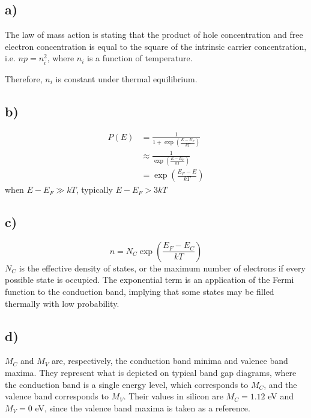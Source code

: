 \subsection*{a)}
The law of mass action is stating that the product of hole concentration and free electron concentration is equal to the square of the intrinsic carrier concentration, i.e. $n p = n_i^2$, where $n_i$ is a function of temperature.

Therefore, $n_i$ is constant under thermal equilibrium.
\subsection*{b)}
\[
\begin{aligned}
P(E) &= \frac{1}{1+\exp\left(\frac{E-E_F}{k T}\right)} \\
&\approx \frac{1}{\exp\left(\frac{E-E_F}{k T}\right)} \\
&= \exp\left(\frac{E_F - E}{k T}\right)
\end{aligned}
\]
when $E - E_F \gg k T$, typically $E - E_F > 3 k T $
\subsection*{c)}
$$n = N_C \exp \left(\frac{E_F - E_C}{k T} \right)$$
$N_C$ is the effective density of states, or the maximum number of electrons if every possible state is occupied.
The exponential term is an application of the Fermi function to the conduction band, implying that some states 
may be filled thermally with low probability.
\subsection*{d)}
$M_C$ and $M_V$ are, respectively, the conduction band minima and valence band maxima. They represent what is depicted on typical band gap diagrams, where the conduction band is a single energy level, which corresponds to $M_C$, and the valence band corresponds to $M_V$. Their values in silicon are $M_C = 1.12$ eV and $M_V = 0$ eV, since the valence band maxima is taken as a reference. %